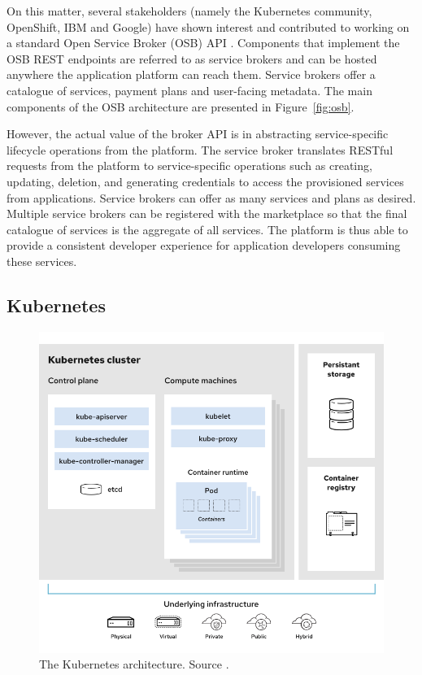 On this matter, several stakeholders (namely the Kubernetes community, OpenShift, IBM and Google) have shown interest and contributed to working on a standard Open Service Broker (OSB) API \cite{osb}. Components that implement the OSB REST endpoints are referred to as service brokers and can be hosted anywhere the application platform can reach them. Service brokers offer a catalogue of services, payment plans and user-facing metadata. The main components of the OSB architecture are presented in Figure~\ref{fig:osb}.

However, the actual value of the broker API is in abstracting service-specific lifecycle operations from the platform. The service broker translates RESTful requests from the platform to service-specific operations such as creating, updating, deletion, and generating credentials to access the provisioned services from applications. Service brokers can offer as many services and plans as desired. Multiple service brokers can be registered with the marketplace so that the final catalogue of services is the aggregate of all services. The platform is thus able to provide a consistent developer experience for application developers consuming these services.

\subsection{Kubernetes}
\label{sec:kubernetes}

\begin{figure}[ht]
\centering
\includegraphics[width=\columnwidth]{figures/kubernetes}
\caption{The Kubernetes architecture. Source \cite{k8s-architecture}.}
\label{fig:kubernetes}
\end{figure}

